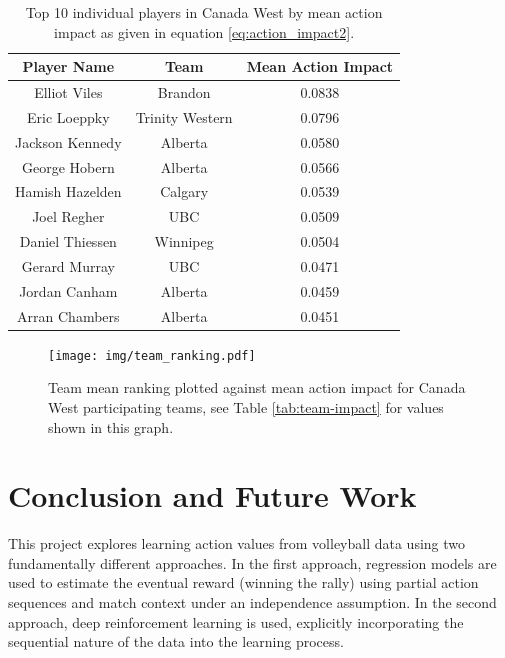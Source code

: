 \documentclass{sfuthesis}
\begin{document}
	\begin{table}
		\centering
		\begin{tabular}{ccc}
			\textbf{Player Name} & \textbf{Team}   & \textbf{Mean Action Impact} \\ \hline
			Elliot Viles         & Brandon         & 0.0838                      \\
			Eric Loeppky         & Trinity Western & 0.0796                      \\
			Jackson Kennedy      & Alberta         & 0.0580                      \\
			George Hobern        & Alberta         & 0.0566                      \\
			Hamish Hazelden      & Calgary         & 0.0539                      \\
			Joel Regher          & UBC             & 0.0509                      \\
			Daniel Thiessen      & Winnipeg        & 0.0504                      \\
			Gerard Murray        & UBC             & 0.0471                      \\
			Jordan Canham        & Alberta         & 0.0459                      \\
			Arran Chambers       & Alberta         & 0.0451                     
		\end{tabular}
		\caption{Top 10 individual players in Canada West by mean action impact as given in equation \eqref{eq:action_impact2}.}
		\label{tab:player-impact}
	\end{table}
	
	\begin{figure}
		\texttt{[image: img/team\_ranking.pdf]}
		\caption{Team mean ranking plotted against mean action impact for Canada West participating teams, see Table \ref{tab:team-impact} for values shown in this graph.}
		\label{fig:team-impact}
	\end{figure}
	
	\chapter{Conclusion and Future Work}
	
	This project explores learning action values from volleyball data using two fundamentally different approaches. In the first approach, regression models are used to estimate the eventual reward (winning the rally) using partial action sequences and match context under an independence assumption. In the second approach, deep reinforcement learning is used, explicitly incorporating the sequential nature of the data into the learning process.
	
\end{document}
